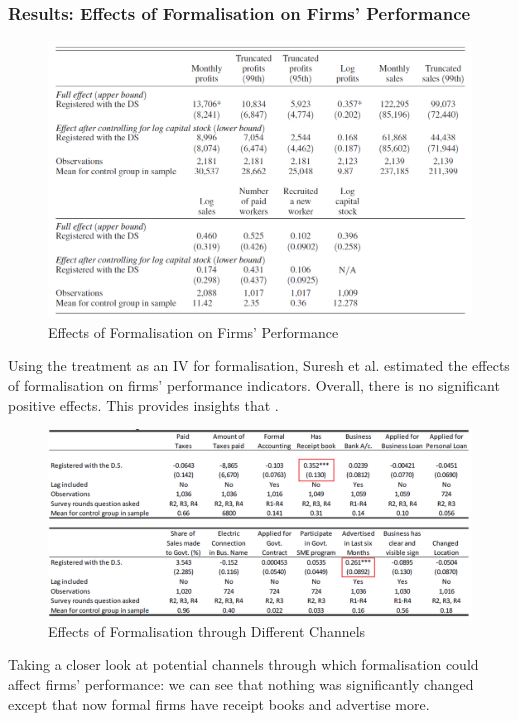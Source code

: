         \subsubsection{Results: Effects of Formalisation on Firms' Performance}
            \begin{figure}[H]
                \centering
                \includegraphics[width=5.5in]{images/ch5/SL formal treatment 3.png}
                \caption{Effects of Formalisation on Firms' Performance}
            \end{figure}
            Using the treatment as an IV for formalisation, Suresh et al. estimated the effects of formalisation on firms' performance indicators. Overall, there is no significant positive effects. This provides insights that .
            \begin{figure}[H]
                \centering
                \includegraphics[width=5.5in]{images/ch5/SL formal treatment 4.png}
                \caption{Effects of Formalisation through Different Channels}
            \end{figure}
            Taking a closer look at potential channels through which formalisation could affect firms' performance: we can see that nothing was significantly changed except that now formal firms have receipt books and advertise more.
        
